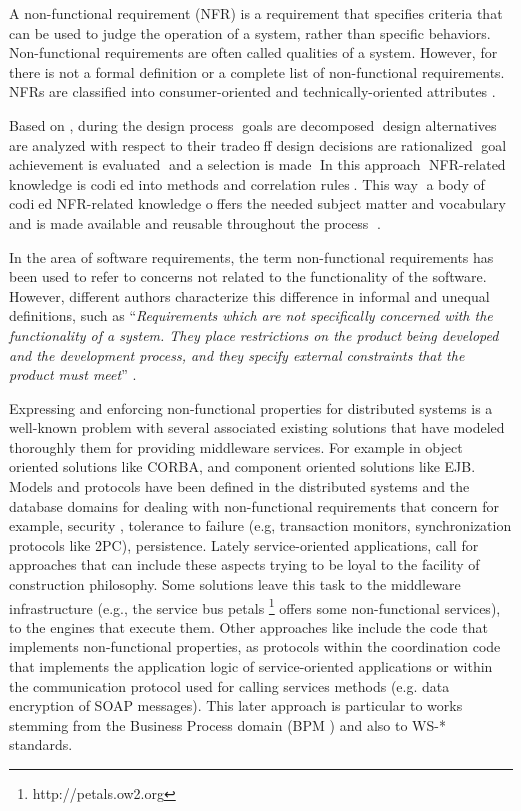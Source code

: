 {A non-functional requirement (NFR) is a requirement that specifies criteria that
can be used to judge the operation of a system, rather than specific behaviors.
Non-functional requirements are often called qualities of a system.
However, for \cite{MylopoulosBook99} there is not a formal definition or a
complete list of non-functional requirements. NFRs are classified into consumer-oriented and
technically-oriented attributes \cite{MylopoulosCN92}. 
  

Based on \cite{MylopoulosCN92}, during the design process goals are decomposed
design alternatives are analyzed with respect to their tradeoff design
decisions are rationalized goal achievement is evaluated and a selection is made In this
approach NFR-related knowledge is codied into methods and correlation rules.
This way a body of codied NFR-related knowledge offers the needed subject
matter and vocabulary and is made available and reusable throughout the
process \cite{Chung91}.

In the area of software requirements, the term non-functional requirements has 
been used to refer to concerns not related to the functionality of the software.
However, different authors characterize this difference in informal and unequal 
definitions, such as ``\textit{Requirements which are not specifically concerned with
the functionality of a system. They place restrictions on the product being developed and the 
development process, and they specify external constraints that the product 
must meet}'' \cite{Chung2009}.

Expressing and enforcing non-functional properties for distributed systems is a
well-known problem with  several associated existing solutions that have modeled
thoroughly  them for providing middleware services. For example in object
oriented solutions  like CORBA, and component oriented solutions like EJB.
Models and protocols have been defined in the distributed systems and the
database domains for dealing with non-functional requirements that concern for
example, security , tolerance to failure (e.g, transaction monitors,
synchronization protocols like 2PC), persistence. Lately service-oriented
applications, call for approaches that can include these aspects trying to be
loyal to the facility of construction philosophy. Some solutions leave this task
to the middleware infrastructure (e.g., the service bus petals
\footnote{http://petals.ow2.org} offers some non-functional services), to the
engines that execute them. Other approaches like \cite{Derks:2001}  include the code
that implements non-functional properties, as protocols within the coordination
code  that implements the application logic of service-oriented applications or
within the communication protocol used for calling services methods (e.g. data
encryption of SOAP messages). This later approach is particular to works
stemming from the Business Process domain (BPM  \cite{bpmn}) and also to WS-*
standards. 

}
